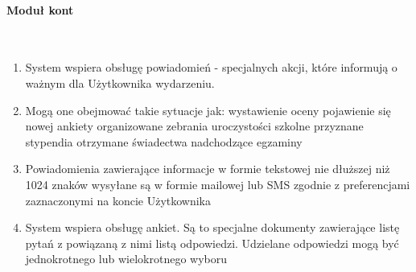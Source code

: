 \documentclass{article}
\begin{document}
\paragraph{Moduł kont} \mbox{}\\
\begin{enumerate}
	\item System wspiera obsługę powiadomień - specjalnych akcji, które informują o ważnym dla Użytkownika wydarzeniu. \item Mogą one obejmować takie sytuacje jak:
	\subitem wystawienie oceny
	\subitem pojawienie się nowej ankiety
	\subitem organizowane zebrania
	\subitem uroczystości szkolne
	\subitem przyznane stypendia
	\subitem otrzymane świadectwa
	\subitem nadchodzące egzaminy
	\item Powiadomienia zawierające informacje w formie tekstowej nie dłuższej niż 1024 znaków wysyłane są w formie mailowej lub SMS zgodnie z preferencjami zaznaczonymi na koncie Użytkownika
	\item System wspiera obsługę ankiet. Są to specjalne dokumenty zawierające listę pytań z powiązaną z nimi listą odpowiedzi. Udzielane odpowiedzi mogą być jednokrotnego lub wielokrotnego wyboru

\end{enumerate}
\end{document}
